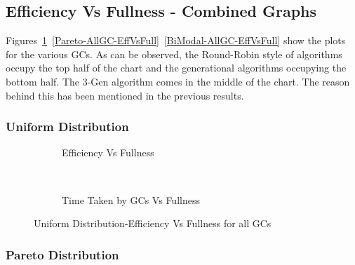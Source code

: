 

\subsection{Efficiency Vs Fullness - Combined Graphs}

Figures~\ref{Uniform-AllGC-EffVsFull}~\ref{Pareto-AllGC-EffVsFull}~\ref{BiModal-AllGC-EffVsFull} show the plots for the various GCs. As can be observed, the Round-Robin style of algorithms occupy the top half of the chart and the generational algorithms occupying the bottom half. The 3-Gen algorithm comes in the middle of the chart. The reason behind this has been mentioned in the previous results.

\subsubsection{Uniform Distribution}

\begin{figure}[H]
        \centering
        \begin{subfigure}[b]{0.4\textwidth}
                \centering
                \caption{Efficiency Vs Fullness} \label{Uniform-AllGC-EffVsFull}
        \end{subfigure}
        ~~~ %
        \begin{subfigure}[b]{0.4\textwidth}
                \centering
                \caption{Time Taken by GCs Vs Fullness} \label{Uniform-GCTimeVsFull}
        \end{subfigure}
        \caption{Uniform Distribution-Efficiency Vs Fullness for all GCs}
\end{figure}

\subsubsection{Pareto Distribution}

